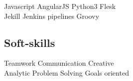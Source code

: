 \documentclass[]{deedy-resume-openfont}
\begin{document}
\begin{minipage}[t]{0.33\textwidth}
Javascript \textbullet{} AngularJS \textbullet{} Python3 \textbullet{} Flesk \\
Jekill \textbullet{} Jenkins pipelines \textbullet{} Groovy \\
\sectionsep

\subsection{Soft-skills}
Teamwork \textbullet{} Communication \textbullet{} Creative \\
Analytic \textbullet{} Problem Solving \textbullet{} Goals oriented  \\

\sectionsep

%
%

\end{minipage} 
\hfill
\end{document}
